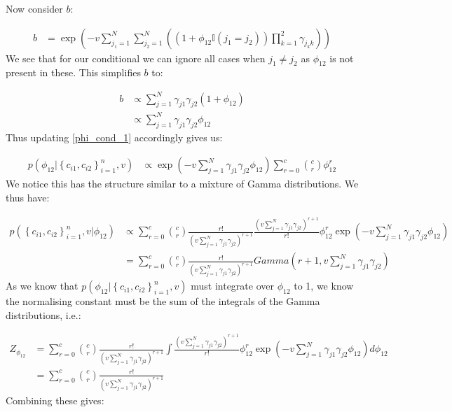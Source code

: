 \documentclass[fleqn,11pt]{wlscirep}
\begin{document}
Now consider $b$:

\begin{align}
b &=  \exp\left(-v \sum_{j_1=1}^N\sum_{j_2=1}^N\left(\left(1 + \phi_{12}\mathbb{I}(j_1 = j_2)\right) \prod_{k=1}^2\gamma_{j_kk}\right)\right)
\end{align}
We see that for our conditional we can ignore all cases when $j_1 \neq j_2$ as $\phi_{12}$ is not present in these. This simplifies $b$ to:

\begin{align}
b &\propto \sum_{j=1}^N \gamma_{j1} \gamma_{j2} \left(1 + \phi_{12}\right) \\
&\propto \sum_{j=1}^N \gamma_{j1} \gamma_{j2} \phi_{12}
\end{align}
Thus updating \eqref{phi_cond_1} accordingly gives us:

\begin{align}
p(\phi_{12} | \left\{c_{i1}, c_{i2}\right\}_{i=1}^n, v) &\propto \exp\left(-v \sum_{j=1}^N \gamma_{j1} \gamma_{j2}\phi_{12}\right)  \sum_{r=0}^c \binom{c}{r} \phi_{12}^r
\end{align}
We notice this has the structure similar to a mixture of Gamma distributions. We thus have:

\begin{align}
 p(\left\{c_{i1}, c_{i2}\right\}_{i=1}^n, v | \phi_{12}) &\propto  \sum_{r=0}^c \binom{c}{r} \frac{r!}{\left(v \sum_{j=1}^N \gamma_{j1} \gamma_{j2}\right)^{r+1}}  \frac{\left(v \sum_{j=1}^N \gamma_{j1} \gamma_{j2}\right)^{r+1}}{r!}\phi_{12}^r \exp\left(-v \sum_{j=1}^N \gamma_{j1} \gamma_{j2}\phi_{12}\right) \\
&= \sum_{r=0}^c  \binom{c}{r} \frac{r!}{\left(v \sum_{j=1}^N \gamma_{j1} \gamma_{j2}\right)^{r+1}} Gamma\left(r+1, v \sum_{j=1}^N \gamma_{j1} \gamma_{j2} \right)
\end{align}
As we know that $p(\phi_{12} | \left\{c_{i1}, c_{i2}\right\}_{i=1}^n, v)$ must integrate over $\phi_{12}$ to 1, we know the normalising constant must be the sum of the integrals of the Gamma distributions, i.e.:

\begin{align}
Z_{\phi_{12}} &= \sum_{r=0}^c   \binom{c}{r} \frac{r!}{\left(v \sum_{j=1}^N \gamma_{j1} \gamma_{j2}\right)^{r+1}}  \int\frac{\left(v \sum_{j=1}^N \gamma_{j1} \gamma_{j2}\right)^{r+1}}{r!}\phi_{12}^r \exp\left(-v \sum_{j=1}^N \gamma_{j1} \gamma_{j2}\phi_{12}\right) d\phi_{12} \\
&= \sum_{r=0}^c  \binom{c}{r} \frac{r!}{\left(v \sum_{j=1}^N \gamma_{j1} \gamma_{j2}\right)^{r+1}}  \label{Z_phi}
\end{align}
Combining these gives:
\end{document}
